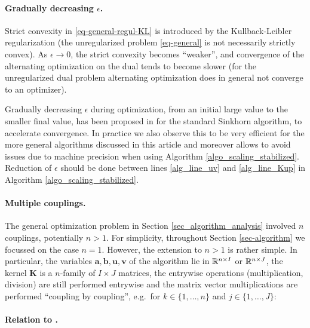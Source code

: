 \paragraph{Gradually decreasing $\epsilon$.}
Strict convexity in \eqref{eq-general-regul-KL} is introduced by the Kull\-back-Leib\-ler regularization (the unregularized problem \eqref{eq-general} is not necessarily strictly convex). As $\epsilon \to 0$, the strict convexity becomes ``weaker'', and convergence of the alternating optimization on the dual tends to become slower (for the unregularized dual problem alternating optimization does in general not converge to an optimizer).

Gradually decreasing $\epsilon$ during optimization, from an initial large value to the smaller final value, has been proposed in \cite{YuilleInvisibleHand1994} for the standard Sinkhorn algorithm, to accelerate convergence.
In practice we also observe this to be very efficient for the more general algorithms discussed in this article and moreover allows to avoid issues due to machine precision when using Algorithm \ref{algo_scaling_stabilized}. Reduction of $\epsilon$ should be done between lines \ref{alg_line_uv} and \ref{alg_line_Kup} in Algorithm \ref{algo_scaling_stabilized}.


\paragraph{Multiple couplings.}
The general optimization problem in Section \ref{sec_algorithm_analysis} involved $n$ couplings, potentially $n>1$. For simplicity, throughout Section \ref{sec-algorithm} we focussed on the case $n=1$. However, the extension to $n>1$ is rather simple.
In particular, the variables $\mathbf{a},\mathbf{b},\mathbf{u},\mathbf{v}$ of the algorithm lie in $\mathbb{R}^{n\times I}$ or $\mathbb{R}^{n\times J}$, the kernel $\mathbf{K}$ is a $n$-family of $I\times J$ matrices, the entrywise operations (multiplication, division) are still performed entrywise and the matrix vector multiplications are performed ``coupling by coupling'', e.g.\ for $k\in \{1,\dots,n\}$ and $j\in \{1,\dots, J\}$:

\paragraph{Relation to \cite{SchmitzerScaling2016}.} 
\label{sec:RelationSparseScaling}


